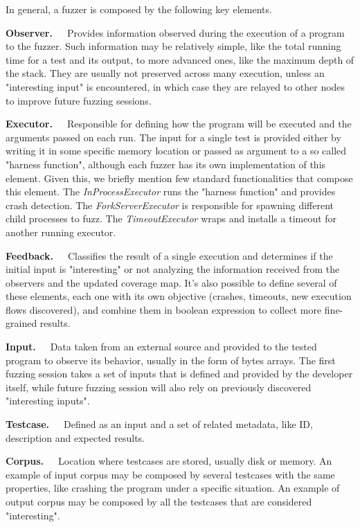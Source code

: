In general, a fuzzer is composed by the following key elements. \cite{afl_docs}

\textbf{Observer.}\ \ \ Provides information observed during the execution of a program to the fuzzer. Such information may be relatively simple, like the total running time for a test and its output, to more advanced ones, like the maximum depth of the stack. They are usually not preserved across many execution, unless an "interesting input" is encountered, in which case they are relayed to other nodes to improve future fuzzing sessions. 

\textbf{Executor.}\ \ \ Responsible for defining how the program will be executed and the arguments passed on each run. The input for a single test is provided either by writing it in some specific memory location or passed as argument to a so called "harness function", although each fuzzer has its own implementation of this element. Given this, we briefly mention few standard functionalities that compose this element. The \textit{InProcessExecutor} runs the "harness function" and provides crash detection. The \textit{ForkServerExecutor} is responsible for spawning different child processes to fuzz. The \textit{TimeoutExecutor} wraps and installs a timeout for another running executor.

\textbf{Feedback.}\ \ \ Classifies the result of a single execution and determines if the initial input is "interesting" or not analyzing the information received from the observers and the updated coverage map. It's also possible to define several of these elements, each one with its own objective (crashes, timeouts, new execution flows discovered), and combine them in boolean expression to collect more fine-grained results.

\textbf{Input.}\ \ \ Data taken from an external source and provided to the tested program to observe its behavior, usually in the form of bytes arrays. The first fuzzing session takes a set of inputs that is defined and provided by the developer itself, while future fuzzing session will also rely on previously discovered "interesting inputs". 

\textbf{Testcase.}\ \ \ Defined as an input and a set of related metadata, like ID, description and expected results.

\textbf{Corpus.}\ \ \ Location where testcases are stored, usually disk or memory. An example of input corpus may be composed by several testcases with the same properties, like crashing the program under a specific situation. An example of output corpus may be composed by all the testcases that are considered "interesting".

